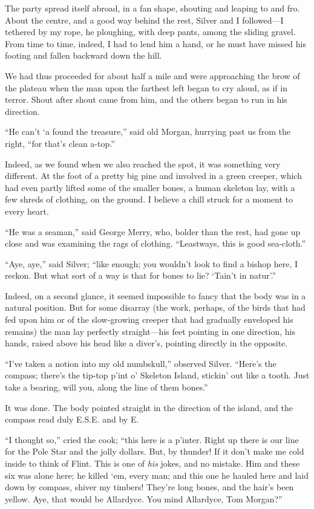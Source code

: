 The party spread itself abroad, in a fan shape, shouting and leaping to and fro. About the centre, and a good way behind the rest, Silver and I followed---I tethered by my rope, he ploughing, with deep pants, among the sliding gravel. From time to time, indeed, I had to lend him a hand, or he must have missed his footing and fallen backward down the hill.

We had thus proceeded for about half a mile and were approaching the brow of the plateau when the man upon the farthest left began to cry aloud, as if in terror. Shout after shout came from him, and the others began to run in his direction.

\enquote{He can’t `a found the treasure,} said old Morgan, hurrying past us from the right, \enquote{for that’s clean a-top.}

Indeed, as we found when we also reached the spot, it was something very different. At the foot of a pretty big pine and involved in a green creeper, which had even partly lifted some of the smaller bones, a human skeleton lay, with a few shreds of clothing, on the ground. I believe a chill struck for a moment to every heart.

\enquote{He was a seaman,} said George Merry, who, bolder than the rest, had gone up close and was examining the rags of clothing. \enquote{Leastways, this is good sea-cloth.}

\enquote{Aye, aye,} said Silver; \enquote{like enough; you wouldn’t look to find a bishop here, I reckon. But what sort of a way is that for bones to lie? `Tain’t in natur’.}

Indeed, on a second glance, it seemed impossible to fancy that the body was in a natural position. But for some disarray (the work, perhaps, of the birds that had fed upon him or of the slow-growing creeper that had gradually enveloped his remains) the man lay perfectly straight---his feet pointing in one direction, his hands, raised above his head like a diver’s, pointing directly in the opposite.

\enquote{I’ve taken a notion into my old numbskull,} observed Silver. \enquote{Here’s the compass; there’s the tip-top p’int o’ Skeleton Island, stickin’ out like a tooth. Just take a bearing, will you, along the line of them bones.}

It was done. The body pointed straight in the direction of the island, and the compass read duly E.S.E. and by E.

\enquote{I thought so,} cried the cook; \enquote{this here is a p’inter. Right up there is our line for the Pole Star and the jolly dollars. But, by thunder! If it don’t make me cold inside to think of Flint. This is one of \textit{his} jokes, and no mistake. Him and these six was alone here; he killed `em, every man; and this one he hauled here and laid down by compass, shiver my timbers! They’re long bones, and the hair’s been yellow. Aye, that would be Allardyce. You mind Allardyce, Tom Morgan?}


